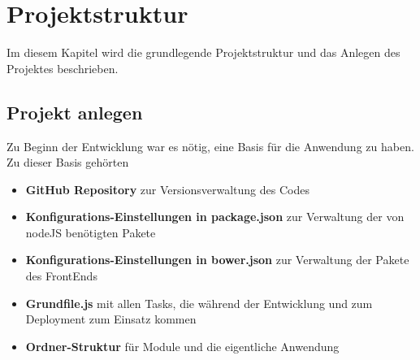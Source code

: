 \chapter {Projektstruktur}
Im diesem Kapitel wird die grundlegende Projektstruktur und das Anlegen des Projektes beschrieben.

\section{Projekt anlegen}
Zu Beginn der Entwicklung war es nötig, eine Basis für die Anwendung zu haben. Zu dieser Basis gehörten
\begin{itemize}
\item \textbf{GitHub Repository} zur Versionsverwaltung des Codes
\item \textbf{Konfigurations-Einstellungen in package.json} zur Verwaltung der von nodeJS benötigten Pakete
\item \textbf{Konfigurations-Einstellungen in bower.json} zur Verwaltung der Pakete des FrontEnds
\item \textbf{Grundfile.js} mit allen Tasks, die während der Entwicklung und zum Deployment zum Einsatz kommen
\item \textbf{Ordner-Struktur} für Module und die eigentliche Anwendung
\end{itemize}

